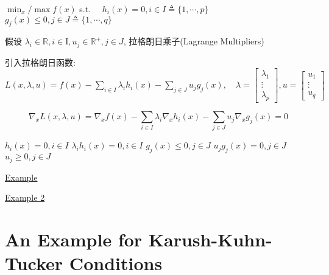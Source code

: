 \begin{definition}
    $ \min _{x} / \max f(x) $
s.t. $ \quad h_{i}(x)=0, i \in I \triangleq\{1, \cdots, p\} $
$ g_{j}(x) \leq 0, j \in J \triangleq\{1, \cdots, q\} $

假设 $ \lambda_{i} \in \mathbb{R}, i \in \mathrm{I}, u_{j} \in \mathbb{R}^{+}, j \in J $, 拉格朗日乘子(Lagrange Multipliers) 

引入拉格朗日函数: $ L(x, \lambda, u)=f(x)-\sum_{i \in I} \lambda_{i} h_{i}(x)-\sum_{j \in J} u_{j} g_{j}(x), \quad \lambda=\left[\begin{array}{c}\lambda_{1} \\ \vdots \\ \lambda_{p}\end{array}\right], u=\left[\begin{array}{c}u_{1} \\ \vdots \\ u_{q}\end{array}\right] $

$$ \nabla_{x} L(x, \lambda, u)=\nabla_{x} f(x)-\sum_{i \in I} \lambda_{i} \nabla_{x} h_{i}(x)-\sum_{j \in J} u_{j} \nabla_{x} g_{j}(x)=0 $$
\end{definition}

\begin{theorem}
    $ h_{i}(x)=0, i \in I $
$ \lambda_{i} h_{i}(x)=0, i \in I $
$ g_{j}(x) \leq 0, j \in J $
$ u_{j} g_{j}(x)=0, j \in J $
$ u_{j} \geq 0, j \in J $
\end{theorem}

\href{https://zhuanlan.zhihu.com/p/38163970}{Example}

\href{https://zhuanlan.zhihu.com/p/26514613}{Example 2}

\section{An Example for Karush-Kuhn-Tucker Conditions}

